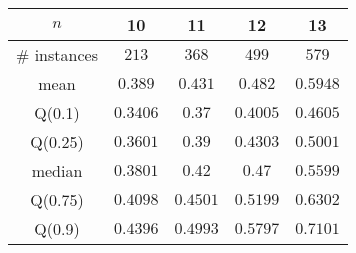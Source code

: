 \begin{tabular}{c|cccc} 
\hline 
$n$ & 10 & 11 & 12 & 13 \tabularnewline 
\hline 
\hline 
\# instances & $213$ & $368$ & $499$ & $579$ \tabularnewline 
mean & $0.389$ & $0.431$ & $0.482$ & $0.5948$ \tabularnewline 
Q(0.1) & $0.3406$ & $0.37$ & $0.4005$ & $0.4605$ \tabularnewline 
Q(0.25) & $0.3601$ & $0.39$ & $0.4303$ & $0.5001$ \tabularnewline 
median & $0.3801$ & $0.42$ & $0.47$ & $0.5599$ \tabularnewline 
Q(0.75) & $0.4098$ & $0.4501$ & $0.5199$ & $0.6302$ \tabularnewline 
Q(0.9) & $0.4396$ & $0.4993$ & $0.5797$ & $0.7101$ \tabularnewline 
\hline 
\end{tabular} 
\medskip{} 

